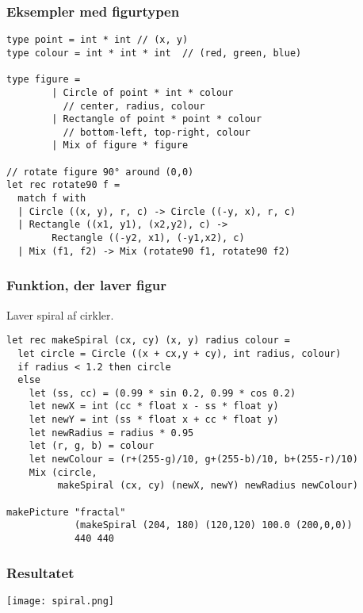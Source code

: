 \documentclass{beamer}
\begin{document}
\begin{frame}[fragile=singleslide]
\frametitle{Eksempler med figurtypen}

{\small
\begin{verbatim}
type point = int * int // (x, y)
type colour = int * int * int  // (red, green, blue)

type figure =
        | Circle of point * int * colour
          // center, radius, colour
        | Rectangle of point * point * colour
          // bottom-left, top-right, colour
        | Mix of figure * figure

// rotate figure 90° around (0,0)
let rec rotate90 f =
  match f with
  | Circle ((x, y), r, c) -> Circle ((-y, x), r, c)
  | Rectangle ((x1, y1), (x2,y2), c) ->
        Rectangle ((-y2, x1), (-y1,x2), c)
  | Mix (f1, f2) -> Mix (rotate90 f1, rotate90 f2)
\end{verbatim}
}

\end{frame}

\begin{frame}[fragile=singleslide]
\frametitle{Funktion, der laver figur}

Laver spiral af cirkler.

{\small
\begin{verbatim}
let rec makeSpiral (cx, cy) (x, y) radius colour =
  let circle = Circle ((x + cx,y + cy), int radius, colour)
  if radius < 1.2 then circle
  else
    let (ss, cc) = (0.99 * sin 0.2, 0.99 * cos 0.2)
    let newX = int (cc * float x - ss * float y)
    let newY = int (ss * float x + cc * float y)
    let newRadius = radius * 0.95
    let (r, g, b) = colour
    let newColour = (r+(255-g)/10, g+(255-b)/10, b+(255-r)/10)
    Mix (circle,
         makeSpiral (cx, cy) (newX, newY) newRadius newColour)

makePicture "fractal"
            (makeSpiral (204, 180) (120,120) 100.0 (200,0,0))
            440 440
\end{verbatim}
}

\end{frame}

\begin{frame}%
\frametitle{Resultatet}

\texttt{[image: spiral.png]}

\end{frame}
\end{document}
